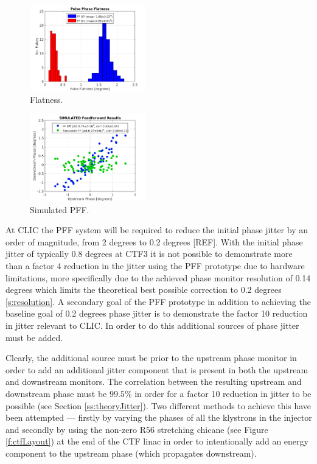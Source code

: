 \begin{figure}
  \centering
  \includegraphics[width=0.45\textwidth]{Figures/BestFF_Flatness}
  \caption{Flatness.}
  \label{f:BestFF_Flatness}
\end{figure}


\begin{figure}
  \centering
  \includegraphics[width=0.45\textwidth]{Figures/BestFF_Simulated}
  \caption{Simulated PFF.}
  \label{f:BestFF_Simulated}
\end{figure}



At CLIC the PFF system will be required to reduce the initial phase jitter by an order of magnitude, from 2 degrees to 0.2 degrees [REF]. With the initial phase jitter of typically 0.8 degrees at CTF3 it is not possible to demonstrate more than a factor 4 reduction in the jitter using the PFF prototype due to hardware limitations, more specifically due to the achieved phase monitor resolution of 0.14 degrees which limits the theoretical best possible correction to 0.2 degrees \ref{s:resolution}. A secondary goal of the PFF prototype in addition to achieving the baseline goal of 0.2 degrees phase jitter is to demonstrate the factor 10 reduction in jitter relevant to CLIC. In order to do this additional sources of phase jitter must be added.

Clearly, the additional source must be prior to the upstream phase monitor in order to add an additional jitter component that is present in both the upstream and downstream monitors. The correlation between the resulting upstream and downstream phase must be  \(99.5\%\) in order for a factor 10 reduction in jitter to be possible (see Section \ref{ss:theoryJitter}). Two different methods to achieve this have been attempted --- firstly by varying the phases of all the klystrons in the injector and secondly by using the non-zero R56 stretching chicane (see Figure \ref{f:ctfLayout}) at the end of the CTF linac in order to intentionally add an energy component to the upstream phase (which propagates downstream).

